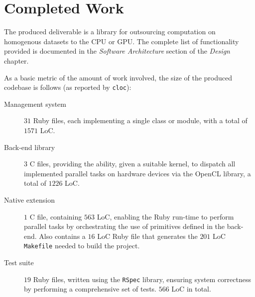 \section{Completed Work}
The produced deliverable is a library for outsourcing computation on homogenous datasets to the \ac{CPU} or \ac{GPU}. The complete list of functionality provided is documented in the \emph{Software Architecture} section of the \emph{Design} chapter.

As a basic metric of the amount of work involved, the size of the produced codebase is follows (as reported by \verb|cloc|):

\begin{description}
  \item[Management system] $31$ Ruby files, each implementing a single class or module, with a total of $1571$ \ac{LoC}.

  \item[Back-end library] $3$ C files, providing the ability, given a suitable kernel, to dispatch all implemented parallel tasks on hardware devices via the \ac{OpenCL} library, a total of $1226$ \ac{LoC}.

  \item[Native extension] $1$ C file, containing $563$ \ac{LoC}, enabling the Ruby run-time to perform parallel tasks by orchestrating the use of primitives defined in the back-end. Also contains a $16$ \ac{LoC} Ruby file that generates the $201$ \ac{LoC} \verb|Makefile| needed to build the project.

  \item[Test suite] $19$ Ruby files, written using the \verb|RSpec| library, ensuring system correctness by performing a comprehensive set of tests. $566$ \ac{LoC} in total.
  \end{description}
